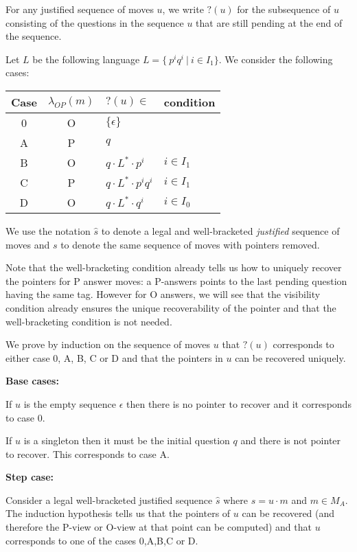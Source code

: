 
For any justified sequence of moves $u$, we write $?(u)$ for the subsequence of $u$ consisting of the questions in the sequence $u$ that are still pending at the end of the sequence.

Let $L$ be the following language $L = \{\ p^i q^i\ | \ i \in I_1 \}$.
We consider the following cases:

\begin{center}
\begin{tabular}{c|c|l|l}
Case & $\lambda_{OP}(m)$ & $?(u) \in$ & condition \\ \hline
0 & O & $\{ \epsilon \}$ \\
A & P & $q$ \\
B & O & $q \cdot L^* \cdot p^i$     & $i \in I_1$ \\
C & P & $q \cdot L^* \cdot p^i q^i$ & $i \in I_1$ \\
D & O & $q \cdot L^* \cdot q^i$      & $i \in I_0$ \\
\end{tabular}
\end{center}

We use the notation $\hat{s}$ to denote a legal and well-bracketed \emph{justified} sequence of moves and
$s$ to denote the same sequence of moves with pointers removed.

Note that the well-bracketing condition already tells us how to uniquely recover
the pointers for P answer moves: a P-answers points
to the last pending question having the same tag. However for O answers, we will see that the visibility condition
already ensures the unique recoverability of the pointer and that the well-bracketing condition is not needed.


We prove by induction on the sequence of moves $u$ that $?(u)$ corresponds to either
case 0, A, B, C or D and that the pointers in $u$ can be recovered uniquely.

\textbf{Base cases:}

If $u$ is the empty sequence $\epsilon$ then there is no pointer to recover and it corresponds to case 0.

If $u$ is a singleton then it must be the initial question $q$ and there is not pointer to recover. This corresponds
to case A.

\textbf{Step case:}

Consider a legal well-bracketed justified sequence $\hat{s}$ where $s = u \cdot m$ and $m \in M_A$.
The induction hypothesis tells us
that the pointers of $u$ can be recovered (and therefore the P-view or O-view at that point can be
computed) and that $u$ corresponds to one of the cases 0,A,B,C or D.

